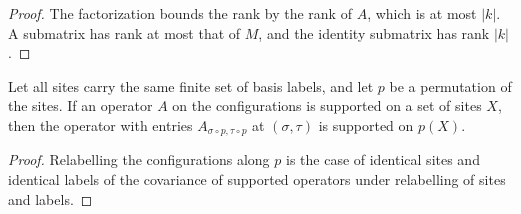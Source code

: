 \begin{proof}\leanok
    The factorization bounds the rank by the rank of $A$, which is at most
    $|k|$. A submatrix has rank at most that of $M$, and the identity
    submatrix has rank $|k|$.
\end{proof}

\begin{lemma}
    \label{aux:permuted-operator-support}
    \leanok
    Let all sites carry the same finite set of basis labels, and let $p$ be a
    permutation of the sites. If an operator $A$ on the configurations is
    supported on a set of sites $X$, then the operator with entries
    $A_{\sigma\circ p,\tau\circ p}$ at $(\sigma,\tau)$ is supported on $p(X)$.
\end{lemma}

\begin{proof}\leanok
    Relabelling the configurations along $p$ is the case of identical sites
    and identical labels of the covariance of supported operators under
    relabelling of sites and labels.
\end{proof}
